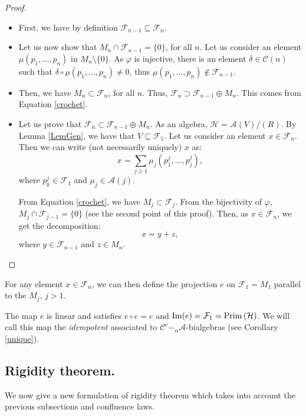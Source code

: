\documentclass[11pt,leqno]{amsart}
\theoremstyle{definition}
\theoremstyle{plain}
\def\Prim{\mathrm{Prim\, }}
\def\Im{\mathop{\rm Im }}
\newcommand{\A}{ \mathcal{A} }
\newcommand{\C}{ \mathcal{C} }
\newcommand{\F}{ \mathcal{F} }
\begin{document}
\begin{proof}
\begin{itemize}
\item First, we have by definition $\F_{n-1} \subseteq \F_{n}$.

\item Let us now show that $M_n \cap \F_{n-1} = \{0\}$, for all $n$.  Let us consider an element $\mu(p_1, \ldots, p_n)$ in $M_n \setminus \{0\}$. As $\varphi$ is injective, there is an element $\delta \in \C(n)$ such that $\delta \circ \mu (p_1, \ldots, p_n) \neq 0$, thus $\mu(p_1, \ldots, p_n) \notin \F_{n-1}$.


\item Then, we have $M_n \subset \F_n$, for all $n$. Thus, $\F_n \supset \F_{n-1} \oplus M_n$. This comes from Equation \eqref{crochet}.

\item Let us prove that $\F_n \subset \F_{n-1} \oplus M_n$. As an algebra, $\mathcal{H}=\A(V)/(R)$. By Lemma \ref{LemGen}, we have that $V \subseteq \F_1$. Let us consider an element $x \in \mathcal{F}_n$. Then we can write (not necessarily uniquely) $x$ as:
\begin{equation*}
x = \sum_{j \geq 1} \mu_j(p^j_1, \ldots, p^j_j),
\end{equation*}
 where $p^j_k \in \F_1$ and $\mu_j \in\A(j)$.
 
 From Equation \eqref{crochet}, we have $M_j \subset \F_j$. From the bijectivity of $\varphi$, $M_j \cap \F_{j-1} = \{0\}$ (see the second point of this proof). Then, as $x \in \mathcal{F}_n$, we get the decomposition:
 \begin{equation*}
x = y + z,
\end{equation*}
 where $y \in \F_{n-1}$ and $z \in M_n$.
\end{itemize}
\end{proof}

For any element $x \in \mathcal{F}_n$, we can then define the projection $e$ on $\mathcal{F}_1 = M_1$ parallel to the $M_j$, $j>1$.

The map $e$ is linear and satisfies $e \circ e = e$ and $\Im(e) = \mathcal{F}_1 = \Prim(\mathcal{H})$. We will call this map the \emph{idempotent} associated to $\C^c-_{\alpha}\A$-bialgebras (see Corollary \ref{unique}).



\subsection{Rigidity theorem.}\label{rig}
We now give a new formulation of rigidity theorem which takes into account the previous subsections and confluence laws.
\end{document}
